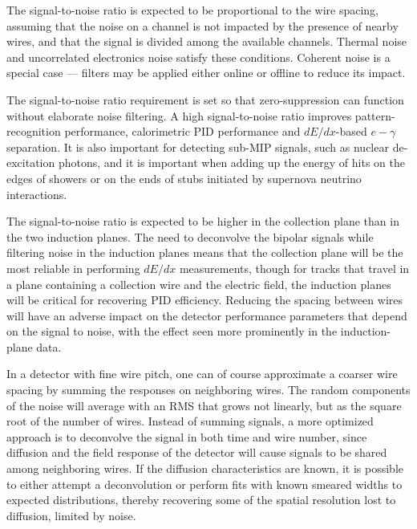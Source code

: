 The signal-to-noise ratio is expected to be proportional to the wire
spacing, assuming that the noise on a channel is not impacted by the
presence of nearby wires, and that the signal is divided among the
available channels.  Thermal noise and uncorrelated electronics noise
satisfy these conditions.  Coherent noise is a special case ---
filters may be applied either online or offline to reduce its impact.

The signal-to-noise ratio requirement is set so that zero-suppression
can function without elaborate noise filtering.  A high
signal-to-noise ratio improves pattern-recognition performance,
calorimetric PID performance and $dE/dx$-based $e-\gamma$ separation.
It is also important for detecting sub-MIP signals, such as nuclear
de-excitation photons, and it is important when adding up the energy
of hits on the edges of showers or on the ends of stubs initiated by
supernova neutrino interactions.

The signal-to-noise ratio is expected to be higher in
the collection plane than in the two induction planes.  The need to
deconvolve the bipolar signals while filtering noise in the induction
planes means that the collection plane will be the most reliable in
performing $dE/dx$ measurements, though for tracks that travel in a
plane containing a collection wire and the electric field, the
induction planes will be critical for recovering PID efficiency.
Reducing the spacing between wires will have an adverse impact on the
detector performance parameters that depend on the signal to noise,
with the effect seen more prominently in the induction-plane data.

In a detector with fine wire pitch, one can of course approximate a
coarser wire spacing by summing the responses on neighboring wires.
The random components of the noise will average with an RMS that grows not linearly, but 
as the square root of the number of wires. 
Instead of summing signals, a more optimized approach is to deconvolve
the signal in both time and wire number, since 
diffusion and the field
response of the detector will cause signals to be shared among
neighboring wires.  If the diffusion characteristics are known, it is possible to either attempt
a deconvolution
or perform fits with known smeared widths to expected distributions,
thereby recovering some of the
spatial resolution lost to diffusion,  limited by noise.

